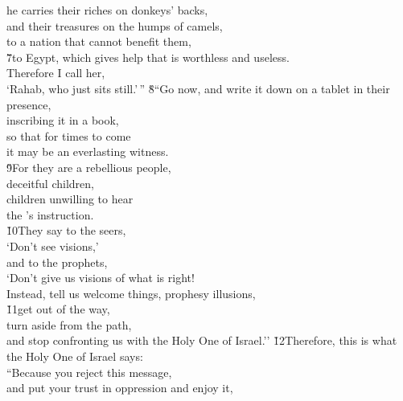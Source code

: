\begin{poetry}
\poemll    he carries their riches on donkeys' backs, \\
\poeml and their treasures on the humps of camels, \\
\poemll    to a nation that cannot benefit them, \\
\poeml \v{7}to Egypt, which gives help that is worthless and useless. \\
\poemll    Therefore I call her, \\
\poemlll       `Rahab, who just sits still.'\,''
\poeml \v{8}``Go now, and write it down on a tablet in their presence, \\
\poemll    inscribing it in a book, \\
\poeml so that for times to come \\
\poemll    it may be an everlasting witness. \\
\poeml \v{9}For they are a rebellious people, \\
\poemll    deceitful children, \\
\poeml children unwilling to hear \\
\poemll    the 's instruction. \\
\poeml \v{10}They say to the seers, \\
\poemll    `Don't see visions,' \\
\poeml and to the prophets, \\
\poemll    `Don't give us visions of what is right! \\
\poemlll       Instead, tell us welcome things, prophesy illusions, \\
\poeml \v{11}get out of the way, \\
\poemll    turn aside from the path, \\
\poemlll       and stop confronting us with the Holy One of Israel.''
\poeml \v{12}Therefore, this is what the Holy One of Israel says: \\
\poeml ``Because you reject this message, \\
\poemll    and put your trust in oppression and enjoy it, \\

\end{poetry}
